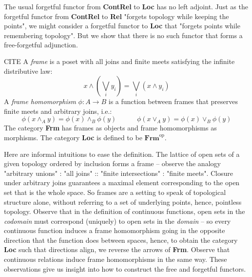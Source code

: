 {The usual forgetful functor from \textbf{ContRel} to \textbf{Loc} has no left adjoint. Just as the forgetful functor from \textbf{ContRel} to \textbf{Rel} "forgets topology while keeping the points", we might consider a forgetful functor to \textbf{Loc} that "forgets points while remembering topology". But we show that there is no such functor that forms a free-forgetful adjunction.

\begin{rem}\bR CITE \e
A \emph{frame} is a poset with all joins and finite meets satisfying the infinite distributive law:
\[x \wedge (\bigvee\limits_{i}y_i) = \bigvee\limits_{i}(x \wedge y_i)\]
A \emph{frame homomorphism} $\phi: A \rightarrow B$ is a function between frames that preserves finite meets and arbitrary joins, i.e.:
\[\phi(x \wedge_A y) = \phi(x) \wedge_B \phi(y) \quad \quad \quad \phi(x \vee_A y) = \phi(x) \vee_B \phi(y)\]
The category \textbf{Frm} has frames as objects and frame homomorphisms as morphisms. The category \textbf{Loc} is defined to be $\textbf{Frm}^\text{op}$.
\end{rem}

\begin{remark}
Here are informal intuitions to ease the definition. The lattice of open sets of a given topology ordered by inclusion forms a frame -- observe the analogy "arbitrary unions" : "all joins" :: "finite intersections" : "finite meets". Closure under arbitrary joins guarantees a maximal element corresponding to the open set that is the whole space. So frames are a setting to speak of topological structure alone, without referring to a set of underlying points, hence, pointless topology. Observe that in the definition of continuous functions, open sets in the \emph{codomain} must correspond (uniquely) to open sets in the \emph{domain} -- so every continuous function induces a frame homomorphism going in the opposite direction that the function does between spaces, hence, to obtain the category \textbf{Loc} such that directions align, we reverse the arrows of \textbf{Frm}. Observe that continuous relations induce frame homomorphisms in the same way. These observations give us insight into how to construct the free and forgetful functors.
\end{remark}

}
